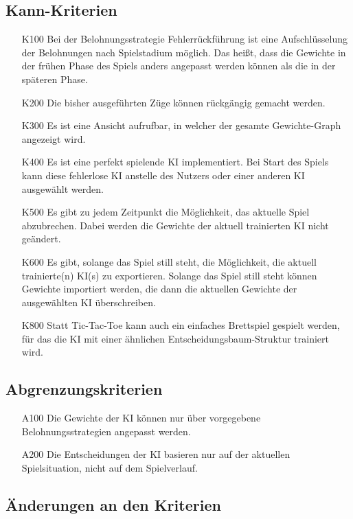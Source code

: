 \documentclass[titlepage]{scrartcl}
\begin{document}
\subsection{Kann-Kriterien}
	\begin{itemize}
		\item[K100] Bei der Belohnungsstrategie Fehlerrückführung ist eine Aufschlüsselung der Belohnungen nach Spielstadium möglich.
				Das heißt, dass die Gewichte in der frühen Phase des Spiels anders angepasst werden können als die in der späteren Phase.
		\item[K200] Die bisher ausgeführten Züge können rückgängig gemacht werden.
		\item[K300] Es ist eine Ansicht aufrufbar, in welcher der gesamte Gewichte-Graph angezeigt wird.
		\item[K400] Es ist eine perfekt spielende KI implementiert.
				Bei Start des Spiels kann diese fehlerlose KI anstelle des Nutzers oder einer anderen KI ausgewählt werden.
		\item[K500] Es gibt zu jedem Zeitpunkt die Möglichkeit, das aktuelle Spiel abzubrechen.
				Dabei werden die Gewichte der aktuell trainierten KI nicht geändert.
		\item[K600] Es gibt, solange das Spiel still steht, die Möglichkeit, die aktuell trainierte(n) KI(s) zu exportieren.
				Solange das Spiel still steht können Gewichte importiert werden, die dann die aktuellen Gewichte der ausgewählten KI überschreiben.
		\item[K800] Statt Tic-Tac-Toe kann auch ein einfaches Brettspiel gespielt werden, für das die KI mit einer ähnlichen Entscheidungsbaum-Struktur trainiert wird.
	\end{itemize}

	
\subsection{Abgrenzungskriterien}
	\begin{itemize}
		\item[A100] Die Gewichte der KI können nur über vorgegebene Belohnungsstrategien angepasst werden.
		\item[A200] Die Entscheidungen der KI basieren nur auf der aktuellen Spielsituation, nicht auf dem Spielverlauf.
	\end{itemize}

\subsection{Änderungen an den Kriterien}
\end{document}
